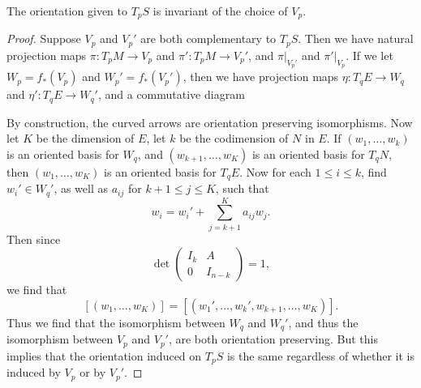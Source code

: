 \begin{lemma}
    The orientation given to $T_p S$ is invariant of the choice of $V_p$.
\end{lemma}
\begin{proof}
    Suppose $V_p$ and $V_p'$ are both complementary to $T_pS$. Then we have natural projection maps $\pi: T_p M \to V_p$ and $\pi' : T_p M \to V_p'$, and $\pi|_{V_p'}$ and $\pi'|_{V_p}$. If we let $W_p = f_*(V_p)$ and $W_p' = f_*(V_p')$, then we have projection maps $\eta: T_q E \to W_q$ and $\eta' : T_q E \to W_q'$, and a commutative diagram
    \begin{center}
    \end{center}
    By construction, the curved arrows are orientation preserving isomorphisms. Now let $K$ be the dimension of $E$, let $k$ be the codimension of $N$ in $E$. If $(w_1, \dots, w_k)$ is an oriented basis for $W_q$, and $(w_{k+1}, \dots, w_K)$ is an oriented basis for $T_q N$, then $(w_1, \dots, w_K)$ is an oriented basis for $T_q E$. Now for each $1 \leq i \leq k$, find $w_i' \in W_q'$, as well as $a_{ij}$ for $k+1 \leq j \leq K$, such that
    \[ w_i = w_i' + \sum_{j = k+1}^K a_{ij} w_j. \]
    Then since
    \[ \det \begin{pmatrix} I_k & A \\ 0 & I_{n-k} \end{pmatrix} = 1, \]
    we find that
    \[ [(w_1, \dots, w_K)] = [(w_1', \dots, w_k', w_{k+1}, \dots, w_K)]. \]
    Thus we find that the isomorphism between $W_q$ and $W_q'$, and thus the isomorphism between $V_p$ and $V_p'$, are both orientation preserving. But this implies that the orientation induced on $T_p S$ is the same regardless of whether it is induced by $V_p$ or by $V_p'$.
\end{proof}

